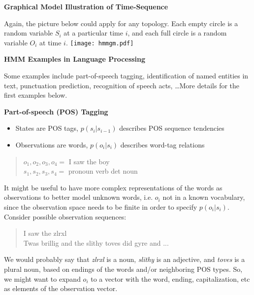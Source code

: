 \documentclass[11pt,titlepage]{article}
\begin{document}
{\bf Graphical Model Illustration of Time-Sequence}

Again, the picture below could apply for any topology.  Each empty
circle is a random variable $S_i$ at a particular time $i$, and each full 
circle is a random variable $O_i$ at time $i$.
\texttt{[image: hmmgm.pdf]}

\clearpage

\centerline{{\huge \bf HMM Examples in Language Processing}}
\vskip 0.2in

Some examples include part-of-speech tagging, identification of named entities
in text, punctuation prediction, recognition of speech acts, \ldots  More
details for the first examples below.

\vskip 0.2in
{\bf Part-of-speech (POS) Tagging}

\begin{itemize}
\item States are POS tags, $p(s_i|s_{i-1})$ describes POS sequence tendencies 
\item Observations are words, $p(o_i|s_i)$ describes word-tag relations
\end{itemize}

\begin{quote}
$o_1, o_2, o_3, o_4 = $ I saw the boy\\
$s_1, s_2, s_3, s_4 = $ pronoun verb det noun
\end{quote}

It might be useful to have more complex representations of the words
as observations to better model unknown words, i.e.  $o_i$ not in a
known vocabulary, since the observation space needs to be finite in
order to specify $p(o_i|s_i)$.  Consider possible observation
sequences:

\begin{quote}
I saw the zlrxl\\
Twas brillig and the slithy toves did gyre and ...
\end{quote}

We would probably say that {\sl zlrxl} is a noun, {\sl slithy} is an
adjective, and {\sl toves} is a plural noun, based on endings of the
words and/or neighboring POS types.  So, we might want to expand $o_i$ to
a vector with the word, ending, capitalization, etc as elements of the 
observation vector.  

\vskip 0.2in
\end{document}
